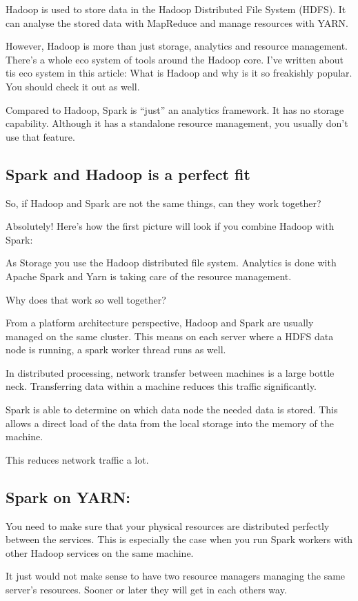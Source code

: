 \documentclass[12pt, numbers=noenddot]{scrreprt} %
\begin{document}
Hadoop is used to store data in the Hadoop Distributed File System (HDFS). It can analyse the stored data with MapReduce and manage resources with YARN.

However, Hadoop is more than just storage, analytics and resource management. There’s a whole eco system of tools around the Hadoop core. I’ve written about tis eco system in this article: What is Hadoop and why is it so freakishly popular. You should check it out as well.

Compared to Hadoop, Spark is “just” an analytics framework. It has no storage capability. Although it has a standalone resource management, you usually don’t use that feature.

\subsection{Spark and Hadoop is a perfect fit}
So, if Hadoop and Spark are not the same things, can they work together?

Absolutely! Here’s how the first picture will look if you combine Hadoop with Spark:


As Storage you use the Hadoop distributed file system. Analytics is done with Apache Spark and Yarn is taking care of the resource management.

Why does that work so well together?

From a platform architecture perspective, Hadoop and Spark are usually managed on the same cluster. This means on each server where a HDFS data node is running, a spark worker thread runs as well.

In distributed processing, network transfer between machines is a large bottle neck. Transferring data within a machine reduces this traffic significantly.

Spark is able to determine on which data node the needed data is stored. This allows a direct load of the data from the local storage into the memory of the machine.

This reduces network traffic a lot.

\subsection{Spark on YARN:} You need to make sure that your physical resources are distributed perfectly between the services. This is especially the case when you run Spark workers with other Hadoop services on the same machine.

It just would not make sense to have two resource managers managing the same server’s resources. Sooner or later they will get in each others way.
\end{document}
